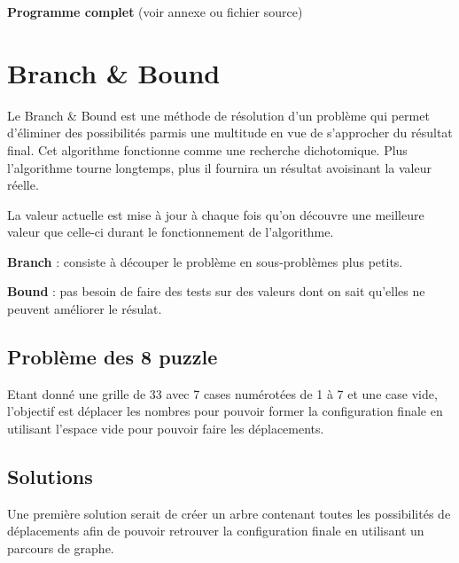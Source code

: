 \documentclass[a4paper]{article}
\begin{document}
\textbf{Programme complet} (voir annexe ou fichier source)


\section{Branch \& Bound}
\label{sec:org5f23cf6}

Le Branch \& Bound est une méthode de résolution d'un problème qui permet d'éliminer des possibilités parmis une multitude en vue de s'approcher du résultat final. Cet algorithme fonctionne comme une recherche dichotomique. Plus l'algorithme tourne longtemps, plus il fournira un résultat avoisinant la valeur réelle.

La valeur actuelle est mise à jour à chaque fois qu'on découvre une meilleure valeur que celle-ci durant le fonctionnement de l'algorithme.

\textbf{Branch} : consiste à découper le problème en sous-problèmes plus petits.

\textbf{Bound} : pas besoin de faire des tests sur des valeurs dont on sait qu'elles ne peuvent améliorer le résulat.


\subsection{Problème des 8 puzzle}
\label{sec:org6890fb5}

Etant donné une grille de 3\texttimes{}3 avec 7 cases numérotées de 1 à 7 et une case vide, l'objectif est déplacer les nombres pour pouvoir former la configuration finale en utilisant l'espace vide pour pouvoir faire les déplacements.

\subsection{Solutions}
\label{sec:org2929a19}

Une première solution serait de créer un arbre contenant toutes les possibilités de déplacements afin de pouvoir retrouver la configuration finale en utilisant un parcours de graphe.
\end{document}

